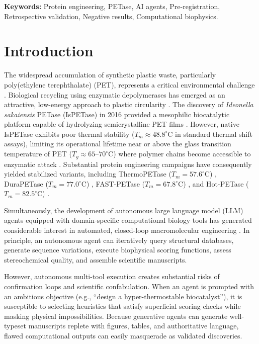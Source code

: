 \documentclass[11pt,a4paper]{article}
\begin{document}
\noindent\textbf{Keywords:} Protein engineering, PETase, AI agents, Pre-registration, Retrospective validation, Negative results, Computational biophysics.

\bigskip

\section{Introduction}

The widespread accumulation of synthetic plastic waste, particularly poly(ethylene terephthalate) (PET), represents a critical environmental challenge \cite{joo2018structural, son2019rational}. Biological recycling using enzymatic depolymerases has emerged as an attractive, low-energy approach to plastic circularity \cite{austin2018characterization, lu2022machine}. The discovery of \textit{Ideonella sakaiensis} PETase (IsPETase) in 2016 provided a mesophilic biocatalytic platform capable of hydrolyzing semicrystalline PET films \cite{joo2018structural}. However, native IsPETase exhibits poor thermal stability ($T_m \approx 48.8^\circ\text{C}$ in standard thermal shift assays), limiting its operational lifetime near or above the glass transition temperature of PET ($T_g \approx 65\text{--}70^\circ\text{C}$) where polymer chains become accessible to enzymatic attack \cite{son2019rational, cui2021computational, bell2022directed}. Substantial protein engineering campaigns have consequently yielded stabilized variants, including ThermoPETase ($T_m = 57.6^\circ\text{C}$) \cite{son2019rational}, DuraPETase ($T_m = 77.0^\circ\text{C}$) \cite{cui2021computational}, FAST-PETase ($T_m = 67.8^\circ\text{C}$) \cite{lu2022machine}, and Hot-PETase ($T_m = 82.5^\circ\text{C}$) \cite{bell2022directed}.

Simultaneously, the development of autonomous large language model (LLM) agents equipped with domain-specific computational biology tools has generated considerable interest in automated, closed-loop macromolecular engineering \cite{lin2023evolutionary, dieckhaus2024transfer}. In principle, an autonomous agent can iteratively query structural databases, generate sequence variations, execute biophysical scoring functions, assess stereochemical quality, and assemble scientific manuscripts. 

However, autonomous multi-tool execution creates substantial risks of confirmation loops and scientific confabulation. When an agent is prompted with an ambitious objective (e.g., ``design a hyper-thermostable biocatalyst''), it is susceptible to selecting heuristics that satisfy superficial scoring checks while masking physical impossibilities. Because generative agents can generate well-typeset manuscripts replete with figures, tables, and authoritative language, flawed computational outputs can easily masquerade as validated discoveries.
\end{document}
